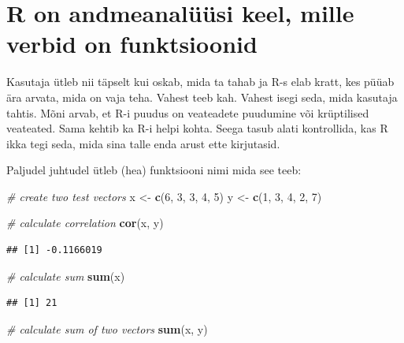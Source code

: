\documentclass[]{book}
\newenvironment{Shaded}{\begin{snugshade}}{\end{snugshade}}
\newcommand{\KeywordTok}[1]{\textcolor[rgb]{0.13,0.29,0.53}{\textbf{#1}}}
\newcommand{\DecValTok}[1]{\textcolor[rgb]{0.00,0.00,0.81}{#1}}
\newcommand{\StringTok}[1]{\textcolor[rgb]{0.31,0.60,0.02}{#1}}
\newcommand{\CommentTok}[1]{\textcolor[rgb]{0.56,0.35,0.01}{\textit{#1}}}
\newcommand{\NormalTok}[1]{#1}
\begin{document}
\chapter{R on andmeanalüüsi keel, mille verbid on
funktsioonid}\label{funs}

Kasutaja ütleb nii täpselt kui oskab, mida ta tahab ja R-s elab kratt,
kes püüab ära arvata, mida on vaja teha. Vahest teeb kah. Vahest isegi
seda, mida kasutaja tahtis. Mõni arvab, et R-i puudus on veateadete
puudumine või krüptilised veateated. Sama kehtib ka R-i helpi kohta.
Seega tasub alati kontrollida, kas R ikka tegi seda, mida sina talle
enda arust ette kirjutasid.

Paljudel juhtudel ütleb (hea) funktsiooni nimi mida see teeb:

\begin{Shaded}
\begin{Highlighting}[]
\CommentTok{# create two test vectors}
\NormalTok{x <-}\StringTok{ }\KeywordTok{c}\NormalTok{(}\DecValTok{6}\NormalTok{, }\DecValTok{3}\NormalTok{, }\DecValTok{3}\NormalTok{, }\DecValTok{4}\NormalTok{, }\DecValTok{5}\NormalTok{)}
\NormalTok{y <-}\StringTok{ }\KeywordTok{c}\NormalTok{(}\DecValTok{1}\NormalTok{, }\DecValTok{3}\NormalTok{, }\DecValTok{4}\NormalTok{, }\DecValTok{2}\NormalTok{, }\DecValTok{7}\NormalTok{)}
\end{Highlighting}
\end{Shaded}

\begin{Shaded}
\begin{Highlighting}[]
\CommentTok{# calculate correlation}
\KeywordTok{cor}\NormalTok{(x, y)}
\end{Highlighting}
\end{Shaded}

\begin{verbatim}
## [1] -0.1166019
\end{verbatim}

\begin{Shaded}
\begin{Highlighting}[]
\CommentTok{# calculate sum}
\KeywordTok{sum}\NormalTok{(x)}
\end{Highlighting}
\end{Shaded}

\begin{verbatim}
## [1] 21
\end{verbatim}

\begin{Shaded}
\begin{Highlighting}[]
\CommentTok{# calculate sum of two vectors}
\KeywordTok{sum}\NormalTok{(x, y)}
\end{Highlighting}
\end{Shaded}
\end{document}
